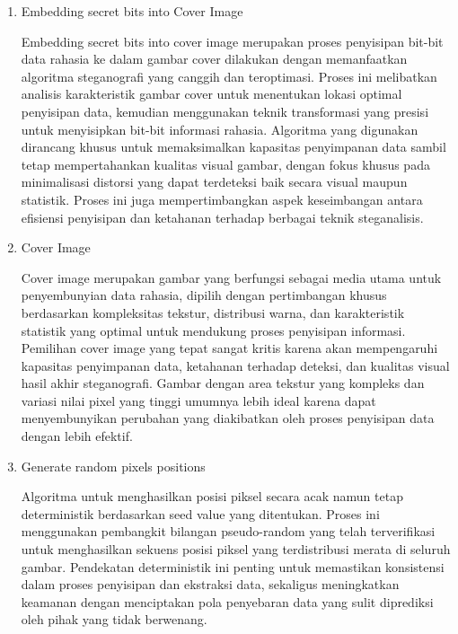 \documentclass{ittelkom}
\begin{document}
\begin{enumerate}
    \item Embedding secret bits into Cover Image

          Embedding secret bits into cover image merupakan proses penyisipan bit-bit data
          rahasia ke dalam gambar cover dilakukan dengan memanfaatkan algoritma
          steganografi yang canggih dan teroptimasi. Proses ini melibatkan analisis
          karakteristik gambar cover untuk menentukan lokasi optimal penyisipan data,
          kemudian menggunakan teknik transformasi yang presisi untuk menyisipkan bit-bit
          informasi rahasia. Algoritma yang digunakan dirancang khusus untuk
          memaksimalkan kapasitas penyimpanan data sambil tetap mempertahankan kualitas
          visual gambar, dengan fokus khusus pada minimalisasi distorsi yang dapat
          terdeteksi baik secara visual maupun statistik. Proses ini juga
          mempertimbangkan aspek keseimbangan antara efisiensi penyisipan dan ketahanan
          terhadap berbagai teknik steganalisis.

    \item Cover Image

          Cover image merupakan gambar yang berfungsi sebagai media utama untuk
          penyembunyian data rahasia, dipilih dengan pertimbangan khusus berdasarkan
          kompleksitas tekstur, distribusi warna, dan karakteristik statistik yang
          optimal untuk mendukung proses penyisipan informasi. Pemilihan cover image yang
          tepat sangat kritis karena akan mempengaruhi kapasitas penyimpanan data,
          ketahanan terhadap deteksi, dan kualitas visual hasil akhir steganografi.
          Gambar dengan area tekstur yang kompleks dan variasi nilai pixel yang tinggi
          umumnya lebih ideal karena dapat menyembunyikan perubahan yang diakibatkan oleh
          proses penyisipan data dengan lebih efektif.

    \item Generate random pixels positions

          Algoritma untuk menghasilkan posisi piksel secara acak namun tetap
          deterministik berdasarkan seed value yang ditentukan. Proses ini menggunakan
          pembangkit bilangan pseudo-random yang telah terverifikasi untuk menghasilkan
          sekuens posisi piksel yang terdistribusi merata di seluruh gambar. Pendekatan
          deterministik ini penting untuk memastikan konsistensi dalam proses penyisipan
          dan ekstraksi data, sekaligus meningkatkan keamanan dengan menciptakan pola
          penyebaran data yang sulit diprediksi oleh pihak yang tidak berwenang.


\end{enumerate}
\end{document}
